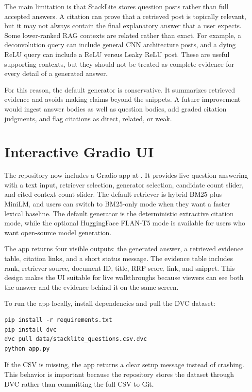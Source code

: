 \documentclass[11pt]{article}
\begin{document}
The main limitation is that StackLite stores question posts rather than full accepted answers. A citation can prove that a retrieved post is topically relevant, but it may not always contain the final explanatory answer that a user expects. Some lower-ranked RAG contexts are related rather than exact. For example, a deconvolution query can include general CNN architecture posts, and a dying ReLU query can include a ReLU versus Leaky ReLU post. These are useful supporting contexts, but they should not be treated as complete evidence for every detail of a generated answer.

For this reason, the default generator is conservative. It summarizes retrieved evidence and avoids making claims beyond the snippets. A future improvement would ingest answer bodies as well as question bodies, add graded citation judgments, and flag citations as direct, related, or weak.

\section{Interactive Gradio UI}

The repository now includes a Gradio app at . It provides live question answering with a text input, retriever selection, generator selection, candidate count slider, and cited context count slider. The default retriever is hybrid BM25 plus MiniLM, and users can switch to BM25-only mode when they want a faster lexical baseline. The default generator is the deterministic extractive citation mode, while the optional HuggingFace FLAN-T5 mode is available for users who want open-source model generation.

The app returns four visible outputs: the generated answer, a retrieved evidence table, citation links, and a short status message. The evidence table includes rank, retriever source, document ID, title, RRF score, link, and snippet. This design makes the UI suitable for live walkthroughs because viewers can see both the answer and the evidence behind it on the same screen.

To run the app locally, install dependencies and pull the DVC dataset:

\begin{verbatim}
pip install -r requirements.txt
pip install dvc
dvc pull data/stacklite_questions.csv.dvc
python app.py
\end{verbatim}

If the CSV is missing, the app returns a clear setup message instead of crashing. This behavior is important because the repository stores the dataset through DVC rather than committing the full CSV to Git.
\end{document}

